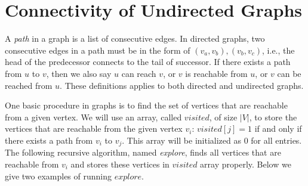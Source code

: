 \setcounter{definition}{0} \setcounter{property}{0} \setcounter{claim}{0} \setcounter{fact}{0} \setcounter{corollary}{0} \setcounter{figure}{0}
\section{Connectivity of Undirected Graphs}

A \emph{path} in a graph is a list of consecutive edges.
In directed graphs, two consecutive edges in a path must be in the form of $(v_a, v_b), (v_b, v_c)$,
i.e., the head of the predecessor connects to the tail of successor. If there exists a path from $u$ to $v$,
then we also say $u$ can reach $v$, or $v$ is reachable from $u$, or $v$ can be reached from $u$.
These definitions applies to both directed and undirected graphs.

%


One basic procedure in graphs is to find the set of vertices that are reachable from a given vertex.
We will use an array, called $visited$, of size $|V|$, to store the vertices that are reachable from
the given vertex $v_i$: $visited[j] = 1$ if and only if there exists a path from $v_i$ to $v_j$.
This array will be initialized as 0 for all entries.
The following recursive algorithm, named \emph{explore}, finds all vertices that are reachable from $v_i$
and stores these vertices in $visited$ array properly.
Below we give two examples of running $explore$. 

